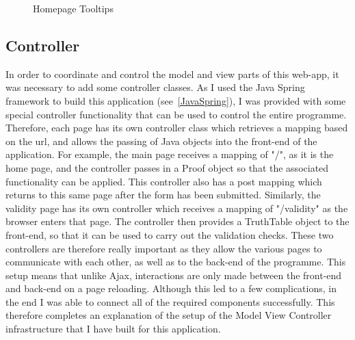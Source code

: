 \begin{figure}[!ht]
	\centering
	\caption{Homepage Tooltips}
\end{figure}

\subsection{Controller}

In order to coordinate and control the model and view parts of this web-app, it was necessary to add some controller classes. As I used the Java Spring framework to build this application (see~\ref{JavaSpring}), I was provided with some special controller functionality that can be used to control the entire programme. Therefore, each page has its own controller class which retrieves a mapping based on the url, and allows the passing of Java objects into the front-end of the application. For example, the main page receives a mapping of "/", as it is the home page, and the controller passes in a Proof object so that the associated functionality can be applied. This controller also has a post mapping which returns to this same page after the form has been submitted. Similarly, the validity page has its own controller which receives a mapping of "/validity" as the browser enters that page. The controller then provides a TruthTable object to the front-end, so that it can be used to carry out the validation checks. These two controllers are therefore really important as they allow the various pages to communicate with each other, as well as to the back-end of the programme. This setup means that unlike Ajax, interactions are only made between the front-end and back-end on a page reloading. Although this led to a few complications, in the end I was able to connect all of the required components successfully. This therefore completes an explanation of the setup of the Model View Controller infrastructure that I have built for this application.

